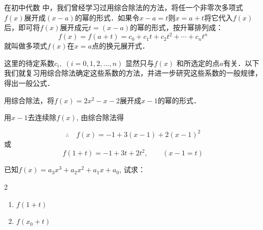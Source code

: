 
 在初中代数
中，我们曾经学习过用综合除法的方法，将任一个非零次多项式$f(x)$展开成$(x-a)$的幂的形式．如果令$x-a=t$则$x=a+t$将它代入$f(x)$后，即可将$f(x)$展开成元$t=(x-a)$的幂的形式，按升幂排列成：
\[f (x) =f (a+t) =c_0+c_1t+c_2t^2+\cdots+c_nt^n\]
就叫做多项式$f(x)$在$x=a$点的换元展开式．

这里的待定系数$c_i,\; (i=0, 1, 2,\ldots,n)$ 显然只与$f(x)$
和所选定的点$a$有关．以下我们就复习用综合除法确定这些系数的方法，并进一步研究这些系数的一般规律，得出一般公式．

    \begin{example}
        用综合除法，将$f (x) =2x^2-x-2$展开成$x-1$的幂的形式．
    \end{example}    
    
    \begin{solution}
  用$x-1$去连续除$f(x)$, 由综合除法得
\begin{center}
\end{center}

\[\therefore\quad f (x) =-1+3 (x-1) +2 (x-1)^2\]
或
\[f (1+t) =-1+3t+2t^2,\qquad (x-1=t)\]
\end{solution}
   
\begin{example}
已知$f(x)=a_3x^3+a_2x^2+a_1x+a_0$, 试求：
\begin{multicols}{2}
\begin{enumerate}
    \item $f (1+t)$
    \item $f(x_0+t)$
\end{enumerate}
\end{multicols}
\end{example}

